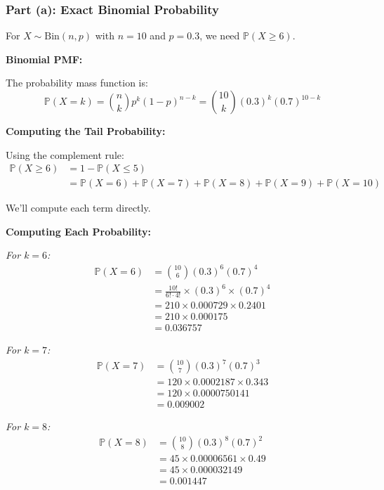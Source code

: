 \documentclass[12pt]{article}
\begin{document}
\subsubsection{Part (a): Exact Binomial Probability}

\begin{solution}
For \(X \sim \text{Bin}(n, p)\) with \(n = 10\) and \(p = 0.3\), we need \(\mathbb{P}(X \geq 6)\).

\textbf{Binomial PMF:}

The probability mass function is:
\[
\mathbb{P}(X = k) = \binom{n}{k} p^k (1-p)^{n-k} = \binom{10}{k} (0.3)^k (0.7)^{10-k}
\]

\textbf{Computing the Tail Probability:}

Using the complement rule:
\begin{align*}
\mathbb{P}(X \geq 6) &= 1 - \mathbb{P}(X \leq 5) \\
&= \mathbb{P}(X = 6) + \mathbb{P}(X = 7) + \mathbb{P}(X = 8) + \mathbb{P}(X = 9) + \mathbb{P}(X = 10)
\end{align*}

We'll compute each term directly.

\textbf{Computing Each Probability:}

\textit{For \(k = 6\):}
\begin{align*}
\mathbb{P}(X = 6) &= \binom{10}{6} (0.3)^6 (0.7)^4 \\
&= \frac{10!}{6! \cdot 4!} \times (0.3)^6 \times (0.7)^4 \\
&= 210 \times 0.000729 \times 0.2401 \\
&= 210 \times 0.000175 \\
&= 0.036757
\end{align*}

\textit{For \(k = 7\):}
\begin{align*}
\mathbb{P}(X = 7) &= \binom{10}{7} (0.3)^7 (0.7)^3 \\
&= 120 \times 0.0002187 \times 0.343 \\
&= 120 \times 0.0000750141 \\
&= 0.009002
\end{align*}

\textit{For \(k = 8\):}
\begin{align*}
\mathbb{P}(X = 8) &= \binom{10}{8} (0.3)^8 (0.7)^2 \\
&= 45 \times 0.00006561 \times 0.49 \\
&= 45 \times 0.000032149 \\
&= 0.001447
\end{align*}


\end{solution}
\end{document}
